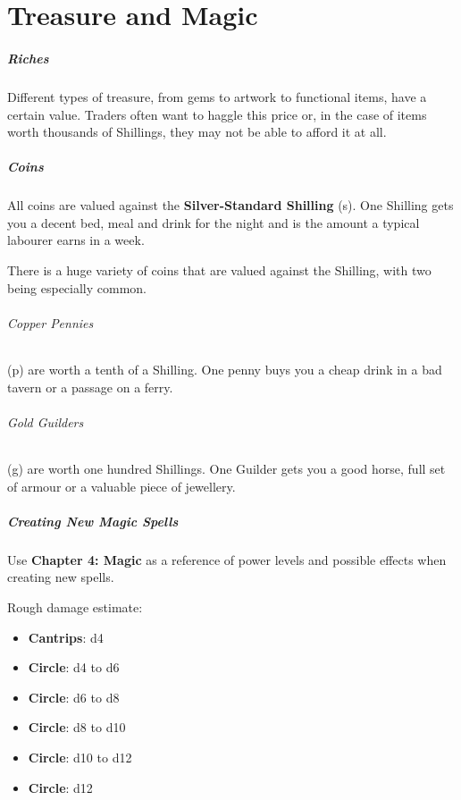 \documentclass[itdr]{subfiles}
\begin{document}
\chapter{Treasure and Magic}

\paragraph{Riches}
Different types of treasure, from gems to artwork to functional items, have a certain value. Traders often want to haggle this price or, in the case of items worth thousands of Shillings, they may not be able to afford it at all.

\paragraph{Coins}
All coins are valued against the \textbf{Silver-Standard Shilling} (s). One Shilling gets you a decent bed, meal and drink for the night and is the amount a typical labourer earns in a week.

There is a huge variety of coins that are valued against the Shilling, with two being especially common.

\subparagraph{Copper Pennies} (p) are worth a tenth of a Shilling. One penny buys you a cheap drink in a bad tavern or a passage on a ferry.

\subparagraph{Gold Guilders} (g) are worth one hundred Shillings. One Guilder gets you a good horse, full set of armour or a valuable piece of jewellery.

\vfill

\paragraph{Creating New Magic Spells}
Use \textbf{Chapter 4: Magic} as a reference of power levels and possible effects when creating new spells.

Rough damage estimate:
\begin{itemize}
	\item \textbf{Cantrips}: d4
	\item \textbf{ Circle}: d4 to d6
	\item \textbf{ Circle}: d6 to d8
	\item \textbf{ Circle}: d8 to d10
	\item \textbf{ Circle}: d10 to d12
	\item \textbf{ Circle}: d12
\end{itemize}
\end{document}
